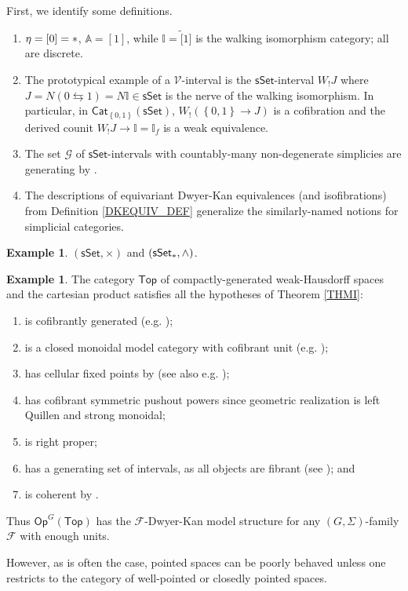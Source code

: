 \documentclass[a4paper,10pt
,draft
]{article}%
\numberwithin{equation}{section}
\numberwithin{figure}{section}
\theoremstyle{definition} %
\newtheorem{example}[equation]{Example}%
\newcommand{\set}[1]{\left\{#1\right\}}%
\newcommand{\Top}{\ensuremath{\mathsf{Top}}}
\newcommand{\sSet}{\ensuremath{\mathsf{sSet}}}%
\newcommand{\Cat}{\mathsf{Cat}}
\newcommand{\Op}{\mathsf{Op}}%
\newcommand{\F}{\ensuremath{\mathcal F}}
\newcommand{\V}{\ensuremath{\mathcal V}}
\newcommand{\I}{\mathbb I}
\newcommand{\1}{\ensuremath{\mathbbm 1}}%
\begin{document}
First, we identify some definitions.
\begin{enumerate}[label = (\roman*)]
\item $\eta = [0] = \**$, $\mathbb A = [1]$, while $\mathbb I = \tilde [1]$ is the walking isomorphism category; all are discrete.
\item  The prototypical example of a $\V$-interval is the $\sSet$-interval $W_!J$ where $J = N(0 \leftrightarrows 1) = N \I \in \sSet$ is the nerve of the walking isomorphism.
      In particular, in $\Cat_{\set{0,1}}(\sSet)$,
      $W_!(\set{0,1} \to J)$ is a cofibration and
      the derived counit $W_!J \to \I = \I_f$ is a weak equivalence.
\item The set $\mathscr G$ of $\sSet$-intervals with countably-many non-degenerate simplicies are generating by \cite[Lemmas 4.2,4.3]{Ber07b}.
\item The descriptions of equivariant Dwyer-Kan equivalences (and isofibrations) from Definition \ref{DKEQUIV_DEF} generalize the similarly-named notions for simplicial categories.
\end{enumerate}


\begin{example}
      $(\sSet, \times)$ and $(\sSet_{\**}, \wedge)$.
\end{example}

\begin{example}
      The category $\Top$ of compactly-generated weak-Hausdorff spaces and the cartesian product satisfies all the hypotheses of Theorem \ref{THMI}:
      \begin{enumerate}[label = (\roman*)]\itemsep-4pt
      \item is cofibrantly generated (e.g. \cite{Pia91});
      \item is a closed monoidal model category with cofibrant unit (e.g. \cite[Prop. 4.2.11]{Hov99});
      \item has cellular fixed points by \cite{Pia91} (see also e.g. \cite[Lemma 3.18]{Ste16});
      \item has cofibrant symmetric pushout powers since geometric realization is left Quillen and strong monoidal;
      \item is right proper;
      \item has a generating set of intervals, as all objects are fibrant (see \cite[Lemma 2.1]{BM13}); and
      \item is coherent by \cite[Lem. 4.16]{BV73}.
      \end{enumerate}
      Thus
      $\Op^G(\Top)$ has the $\F$-Dwyer-Kan model structure for any $(G, \Sigma)$-family $\F$ with enough units.


      However, as is often the case, pointed spaces can be poorly behaved unless one restricts to the category of well-pointed or closedly pointed spaces. %
\end{example}
\end{document}
